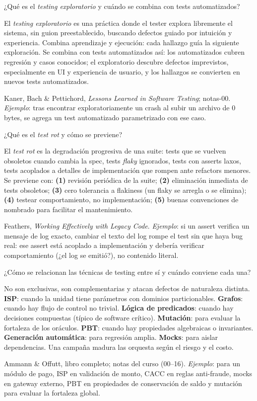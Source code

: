 \documentclass[11pt,a4paper]{article}
\newcounter{preg}
\newcommand{\qa}[3]{%
  \stepcounter{preg}%
  \vspace{0.4em}
  \begin{preguntabox}{\thepreg}
  #1
  \end{preguntabox}
  \begin{respuestabox}
  #2
  \end{respuestabox}
  \begin{refbox}
  #3
  \end{refbox}
  \vspace{0.6em}
}
\begin{document}
\qa{¿Qué es el \emph{testing exploratorio} y cuándo se combina con tests automatizados?}
{El \emph{testing exploratorio} es una práctica donde el tester explora libremente el sistema, sin guion preestablecido, buscando defectos guiado por intuición y experiencia. Combina aprendizaje y ejecución: cada hallazgo guía la siguiente exploración. Se combina con tests automatizados así: los automatizados cubren regresión y casos conocidos; el exploratorio descubre defectos imprevistos, especialmente en UI y experiencia de usuario, y los hallazgos se convierten en nuevos tests automatizados.}
{Kaner, Bach \& Pettichord, \emph{Lessons Learned in Software Testing}; notas-00. \emph{Ejemplo}: tras encontrar exploratoriamente un crash al subir un archivo de 0 bytes, se agrega un test automatizado parametrizado con ese caso.}

\qa{¿Qué es el \emph{test rot} y cómo se previene?}
{El \emph{test rot} es la degradación progresiva de una suite: tests que se vuelven obsoletos cuando cambia la spec, tests \emph{flaky} ignorados, tests con asserts laxos, tests acoplados a detalles de implementación que rompen ante refactors menores. Se previene con: \textbf{(1)} revisión periódica de la suite; \textbf{(2)} eliminación inmediata de tests obsoletos; \textbf{(3)} cero tolerancia a flakiness (un flaky se arregla o se elimina); \textbf{(4)} testear comportamiento, no implementación; \textbf{(5)} buenas convenciones de nombrado para facilitar el mantenimiento.}
{Feathers, \emph{Working Effectively with Legacy Code}. \emph{Ejemplo}: si un assert verifica un mensaje de log exacto, cambiar el texto del log rompe el test sin que haya bug real: ese assert está acoplado a implementación y debería verificar comportamiento (¿el log se emitió?), no contenido literal.}

\qa{¿Cómo se relacionan las técnicas de testing entre sí y cuándo conviene cada una?}
{No son exclusivas, son complementarias y atacan defectos de naturaleza distinta. \textbf{ISP}: cuando la unidad tiene parámetros con dominios particionables. \textbf{Grafos}: cuando hay flujo de control no trivial. \textbf{Lógica de predicados}: cuando hay decisiones compuestas (típico de software crítico). \textbf{Mutación}: para evaluar la fortaleza de los oráculos. \textbf{PBT}: cuando hay propiedades algebraicas o invariantes. \textbf{Generación automática}: para regresión amplia. \textbf{Mocks}: para aislar dependencias. Una campaña madura las orquesta según el riesgo y el costo.}
{Ammann \& Offutt, libro completo; notas del curso (00--16). \emph{Ejemplo}: para un módulo de pago, ISP en validación de monto, CACC en reglas anti-fraude, mocks en gateway externo, PBT en propiedades de conservación de saldo y mutación para evaluar la fortaleza global.}
\end{document}

